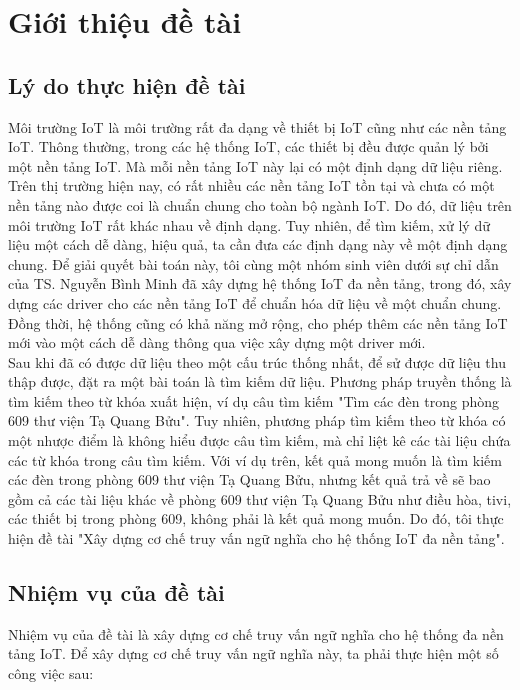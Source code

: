 \chapter{Giới thiệu đề tài}
\section{Lý do thực hiện đề tài}
Môi trường IoT là môi trường rất đa dạng về thiết bị IoT cũng như các nền tảng IoT. Thông thường, trong các hệ thống IoT, các thiết bị đều được quản lý bởi một nền tảng IoT. Mà mỗi nền tảng IoT này lại có một định dạng dữ liệu riêng. Trên thị trường hiện nay, có rất nhiều các nền tảng IoT tồn tại và chưa có một nền tảng nào được coi là chuẩn chung cho toàn bộ ngành IoT. Do đó, dữ liệu trên môi trường IoT rất khác nhau về định dạng. Tuy nhiên, để tìm kiếm, xử lý dữ liệu một cách dễ dàng, hiệu quả, ta cần đưa các định dạng này về một định dạng chung. Để giải quyết bài toán này, tôi cùng một nhóm sinh viên dưới sự chỉ dẫn của TS. Nguyễn Bình Minh đã xây dựng hệ thống IoT đa nền tảng, trong đó, xây dựng các driver cho các nền tảng IoT để chuẩn hóa dữ liệu về một chuẩn chung. Đồng thời, hệ thống cũng có khả năng mở rộng, cho phép thêm các nền tảng IoT mới vào một cách dễ dàng thông qua việc xây dựng một driver mới. \\

Sau khi đã có được dữ liệu theo một cấu trúc thống nhất,  để sử được dữ liệu thu thập được,  đặt ra một bài toán là tìm kiếm dữ liệu. Phương pháp truyền thống là tìm kiếm theo từ khóa xuất hiện, ví dụ câu tìm kiếm "Tìm các đèn trong phòng 609 thư viện Tạ Quang Bửu". Tuy nhiên, phương pháp tìm kiếm theo từ khóa có một nhược điểm là không hiểu được câu tìm kiếm, mà chỉ liệt kê các tài liệu chứa các từ khóa trong câu tìm kiếm. Với ví dụ trên, kết quả mong muốn là tìm kiếm các đèn trong phòng 609 thư viện Tạ Quang Bửu, nhưng kết quả trả về sẽ bao gồm cả các tài liệu khác về phòng 609 thư viện Tạ Quang Bửu như điều hòa, tivi, các thiết bị trong phòng 609, không phải là kết quả mong muốn. Do đó, tôi thực hiện đề tài "Xây dựng cơ chế truy vấn ngữ nghĩa cho hệ thống IoT đa nền tảng".\\

\section{Nhiệm vụ của đề tài}
Nhiệm vụ của đề tài là xây dựng cơ chế truy vấn ngữ nghĩa cho hệ thống đa nền tảng IoT. Để xây dựng cơ chế truy vấn ngữ nghĩa này, ta phải thực hiện một số công việc sau:

